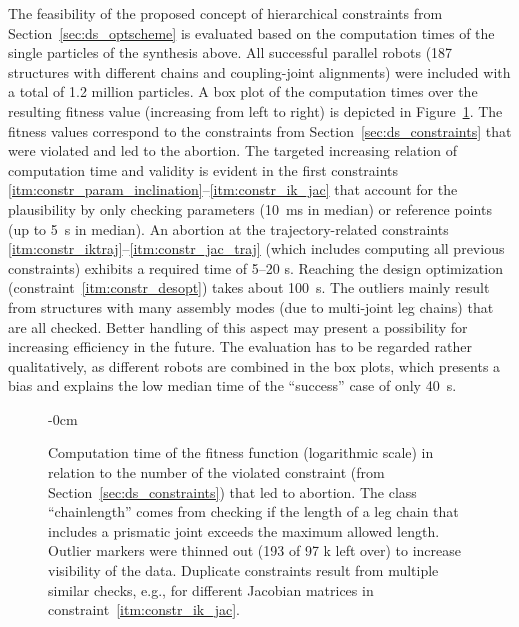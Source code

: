 The feasibility of the proposed concept of hierarchical constraints from Section~\ref{sec:ds_optscheme} is evaluated based on the computation times of the single particles of the synthesis above.
All successful parallel robots (187 structures with different chains and coupling-joint alignments) were included with a total of 1.2 %
%
million particles.
A box plot of the computation times over the resulting fitness value (increasing from left to right) is depicted in Figure~\ref{fig:computation_time}.
The fitness values correspond to the constraints from Section~\ref{sec:ds_constraints} that were violated and led to the abortion.
The targeted increasing relation of computation time and validity is evident in the first constraints \ref{itm:constr_param_inclination}--\ref{itm:constr_ik_jac} that account for the plausibility by only checking parameters (\SI{10}{\milli\second} in median) or reference points (up to \SI{5}{\second} in median).
An abortion at the trajectory-related constraints \ref{itm:constr_iktraj}--\ref{itm:constr_jac_traj} (which includes computing all previous constraints) exhibits a required time of 5--20 s.
Reaching the design optimization (constraint~\ref{itm:constr_desopt}) takes about \SI{100}{\second}. The outliers mainly result from structures with many assembly modes (due to multi-joint leg chains) that are all checked.
%
Better handling of this aspect may present a possibility for increasing efficiency in the future.
The evaluation has to be regarded rather qualitatively, as different robots are combined in the box plots, which presents a bias and explains the low median time of the ``success'' case of only \SI{40}{\second}. %

\vspace{-2pt}
\begin{figure}[H]
  \begin{adjustwidth}{-\extralength}{0cm}
    
  \end{adjustwidth}
  \caption{Computation
    time of the fitness function (logarithmic scale) in relation to the number of the violated constraint (from Section~\ref{sec:ds_constraints}) that led to abortion. The class ``chainlength'' comes from checking if the length of a leg chain that includes a prismatic joint exceeds the maximum allowed length. Outlier markers were thinned out (193 of 97 k left over) to increase visibility of the data. Duplicate constraints result from multiple similar checks, e.g., for different Jacobian matrices in constraint~\ref*{itm:constr_ik_jac}.}
  \label{fig:computation_time}
\end{figure}



